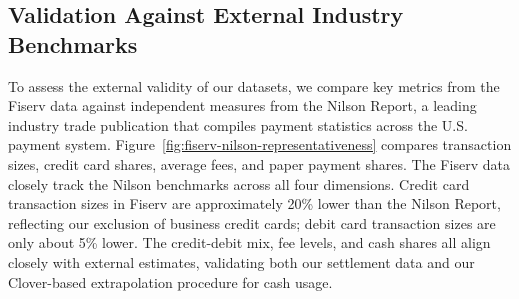 \documentclass[main.tex]{subfiles}
\begin{document}
\subsection{Validation Against External Industry Benchmarks}

To assess the external validity of our datasets, we compare key metrics from the Fiserv data against independent measures from the Nilson Report, a leading industry trade publication that compiles payment statistics across the U.S. payment system.
Figure~\ref{fig:fiserv-nilson-representativeness} compares transaction sizes, credit card shares, average fees, and paper payment shares.
The Fiserv data closely track the Nilson benchmarks across all four dimensions.
Credit card transaction sizes in Fiserv are approximately 20\% lower than the Nilson Report, reflecting our exclusion of business credit cards; debit card transaction sizes are only about 5\% lower.
The credit-debit mix, fee levels, and cash shares all align closely with external estimates, validating both our settlement data and our Clover-based extrapolation procedure for cash usage.

\clearpage
\end{document}

